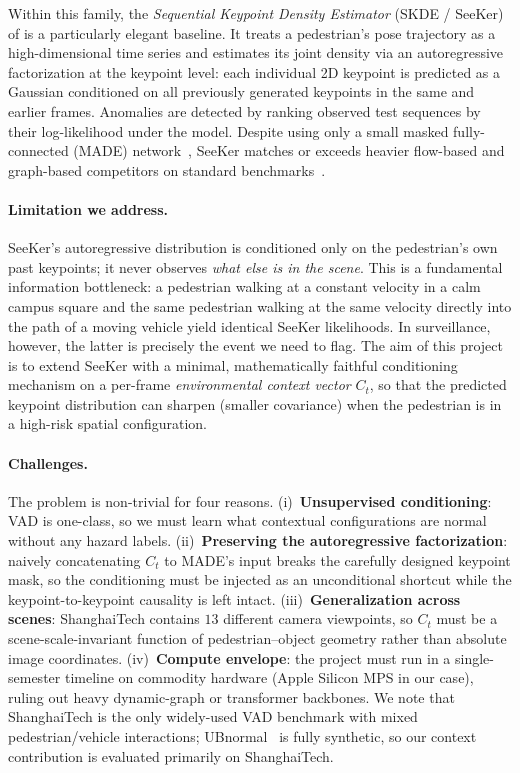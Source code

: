 \documentclass{article}
\begin{document}
Within this family, the \emph{Sequential Keypoint Density Estimator}
(SKDE / SeeKer) of \citet{delic2025seeker} is a particularly elegant baseline.
It treats a pedestrian's pose trajectory as a high-dimensional time series and
estimates its joint density via an autoregressive factorization at the
keypoint level: each individual 2D keypoint is predicted as a Gaussian
conditioned on all previously generated keypoints in the same and earlier
frames. Anomalies are detected by ranking observed test sequences by their
log-likelihood under the model. Despite using only a small masked
fully-connected (MADE) network~\citep{germain2015made}, SeeKer matches or
exceeds heavier flow-based and graph-based competitors on standard
benchmarks~\citep{hirschorn2023normalizing,liu2018future}.

\paragraph{Limitation we address.}
SeeKer's autoregressive distribution is conditioned only on the pedestrian's
own past keypoints; it never observes \emph{what else is in the scene}. This
is a fundamental information bottleneck: a pedestrian walking at a constant
velocity in a calm campus square and the same pedestrian walking at the same
velocity directly into the path of a moving vehicle yield identical SeeKer
likelihoods. In surveillance, however, the latter is precisely the event we
need to flag. The aim of this project is to extend SeeKer with a minimal,
mathematically faithful conditioning mechanism on a per-frame
\emph{environmental context vector} $C_t$, so that the predicted keypoint
distribution can sharpen (smaller covariance) when the pedestrian is in a
high-risk spatial configuration.

\paragraph{Challenges.}
The problem is non-trivial for four reasons. (i)~\textbf{Unsupervised
conditioning}: VAD is one-class, so we must learn what contextual
configurations are normal without any hazard labels. (ii)~\textbf{Preserving
the autoregressive factorization}: naively concatenating $C_t$ to MADE's
input breaks the carefully designed keypoint mask, so the conditioning must
be injected as an unconditional shortcut while the keypoint-to-keypoint
causality is left intact. (iii)~\textbf{Generalization across scenes}:
ShanghaiTech contains $13$ different camera viewpoints, so $C_t$ must be a
scene-scale-invariant function of pedestrian--object geometry rather than
absolute image coordinates. (iv)~\textbf{Compute envelope}: the project must
run in a single-semester timeline on commodity hardware (Apple Silicon MPS
in our case), ruling out heavy dynamic-graph or transformer backbones. We
note that ShanghaiTech is the only widely-used VAD benchmark with mixed
pedestrian/vehicle interactions; UBnormal~\citep{acsintoae2022ubnormal} is
fully synthetic, so our context contribution is evaluated primarily on
ShanghaiTech.
\end{document}
